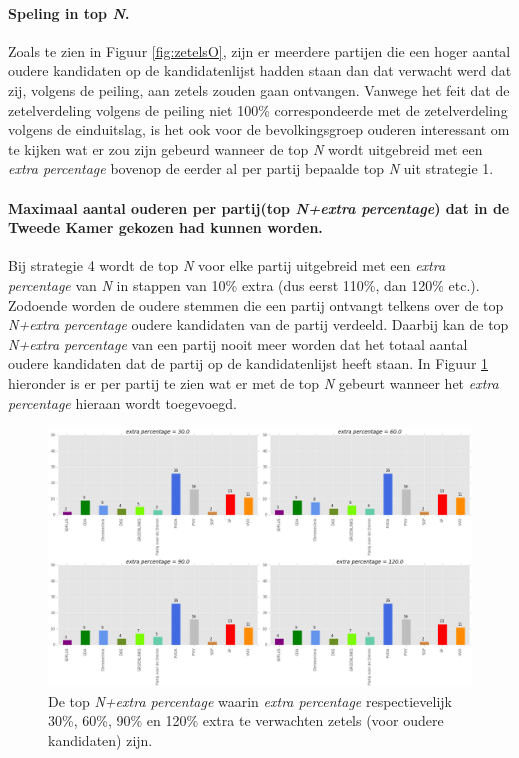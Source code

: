 \paragraph{Speling in top \textit{N}.}
Zoals te zien in Figuur \ref{fig:zetelsO}, zijn er meerdere partijen die een hoger aantal oudere kandidaten op de kandidatenlijst hadden staan dan dat verwacht werd dat zij, volgens de peiling, aan zetels zouden gaan ontvangen. Vanwege het feit dat de zetelverdeling volgens de peiling niet 100\% correspondeerde met de zetelverdeling volgens de einduitslag, is het ook voor de bevolkingsgroep ouderen interessant om te kijken wat er zou zijn gebeurd wanneer de top \textit{N} wordt uitgebreid met een \textit{extra percentage} bovenop de eerder al per partij bepaalde top \textit{N} uit strategie 1.



\paragraph{Maximaal aantal ouderen per partij(top \textit{N+extra percentage}) dat in de Tweede Kamer gekozen had kunnen worden.} 
Bij strategie 4 wordt de top \textit{N} voor elke partij uitgebreid met een \textit{extra percentage} van \textit{N} in stappen van 10\% extra (dus eerst 110\%, dan 120\% etc.). Zodoende worden de oudere stemmen die een partij ontvangt telkens over de top \textit{N+extra percentage} oudere kandidaten van de partij verdeeld. Daarbij kan de top \textit{N+extra percentage} van een partij nooit meer worden dat het totaal aantal oudere kandidaten dat de partij op de kandidatenlijst heeft staan. In Figuur \ref{fig:NexpO} hieronder is er per partij te zien wat er met de top \textit{N} gebeurt wanneer het \textit{extra percentage} hieraan wordt toegevoegd.  


\begin{figure}[H]

	\includegraphics[width=\linewidth]{topN_vermenigvuldiging_ouderen.png}

			\caption{De top \textit{N+extra percentage} waarin \textit{extra percentage} respectievelijk 30\%, 60\%, 90\% en 120\% extra te verwachten zetels (voor oudere kandidaten)  zijn.}

\label{fig:NexpO}
\end{figure}



